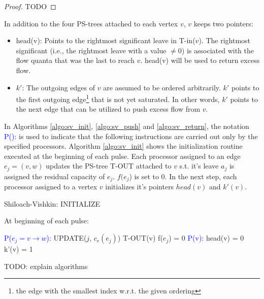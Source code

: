 \documentclass[a4paper,10pt, twocolumn]{article}
\begin{document}
\begin{proof}
TODO
\end{proof}

In addition to the four PS-trees attached to each vertex $v$, $v$ keeps two pointers:
\begin{itemize}
	\item head(v): Points to the rightmost significant leave in T-in($v$). The rightmost significant (i.e., the rightmost leave with a value $\neq 0$) is associated with the flow quanta that was the last to reach $v$. head(v) will be used to return excess flow. 
	\item $k'$: The outgoing edges of $v$ are assumed to be ordered arbitrarily. $k'$ points to the first outgoing edge\footnote{the edge with the smallest index w.r.t. the given ordering} that is not yet saturated. In other words, $k'$ points to the next edge that can be utilized to push excess flow from $v$.  
\end{itemize}

In Algorithms \ref{algo:sv_init}, \ref{algo:sv_push} and \ref{algo:sv_return}, the notation \textcolor{blue}{P():} is used to indicate that the following instructions are carried out only by the specified processors. Algorithm \ref{algo:sv_init} shows the initialization routine executed at the beginning of each pulse. Each processor assigned to an edge $e_j = (v, w)$ updates the PS-tree T-OUT attached to $v$ s.t. it's leave $a_j$ is assigned the residual capacity of $e_j$. $f(e_j$) is set to 0. In the next step, each processor assigned to a vertex $v$ initializes it's pointers $head(v)$ and $k'(v)$.

\begin{algorithm}
\caption{Shiloach-Vishkin: INITIALIZE}
\label{algo:sv_init}
At beginning of each pulse:	
\begin{algorithmic}[1]
		\State \textcolor{blue}{P($e_j = v \rightarrow w$):}
		\State UPDATE($j$, $c_r(e_j)$) T-OUT(v)
		\State f($e_j$) = 0
		\State \textcolor{blue}{P(v):}
		\State head(v) = 0	
		\State k'(v) = 1	
 	\EndFunction
\end{algorithmic}
\end{algorithm}

TODO: explain algorithms
\end{document}
